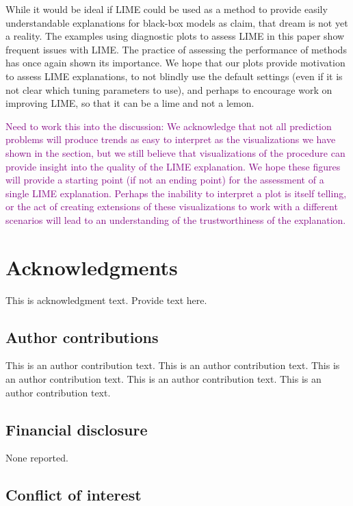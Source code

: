 \documentclass[AMS,STIX2COL]{WileyNJD-v2}\usepackage[]{graphicx}\usepackage[]{color}
\newcommand{\kgc}[1]{\textcolor{purple}{#1}}
\begin{document}
{While it would be ideal if LIME could be used as a method to provide easily understandable explanations for black-box models as \citep{ribeiro:2016} claim, that dream is not yet a reality. The examples using diagnostic plots to assess LIME in this paper show frequent issues with LIME. The practice of assessing the performance of methods has once again shown its importance. We hope that our plots provide motivation to assess LIME explanations, to not blindly use the default settings (even if it is not clear which tuning parameters to use), and perhaps to encourage work on improving LIME, so that it can be a lime and not a lemon.

\kgc{Need to work this into the discussion: We acknowledge that not all prediction problems will produce trends as easy to interpret as the visualizations we have shown in the section, but we still believe that visualizations of the procedure can provide insight into the quality of the LIME explanation. We hope these figures will provide a starting point (if not an ending point) for the assessment of a single LIME explanation. Perhaps the inability to interpret a plot is itself telling, or the act of creating extensions of these visualizations to work with a different scenarios will lead to an understanding of the trustworthiness of the explanation.}

\section*{Acknowledgments}

This is acknowledgment text. Provide text here.

\subsection*{Author contributions}

This is an author contribution text. This is an author contribution text. This is an author contribution text. This is an author contribution text. This is an author contribution text.

\subsection*{Financial disclosure}

None reported.

\subsection*{Conflict of interest}

}
\end{document}
